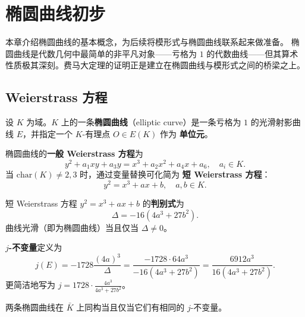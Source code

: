 \chapter{椭圆曲线初步}
\label{ch:elliptic-curves-intro}

本章介绍椭圆曲线的基本概念，为后续将模形式与椭圆曲线联系起来做准备。
椭圆曲线是代数几何中最简单的非平凡对象——亏格为 $1$ 的代数曲线——但其算术
性质极其深刻。费马大定理的证明正是建立在椭圆曲线与模形式之间的桥梁之上。

\section{Weierstrass 方程}
\label{sec:weierstrass-equation}

\begin{definition}[椭圆曲线]
\label{def:elliptic-curve}
设 $K$ 为域。$K$ 上的一条\textbf{椭圆曲线}（elliptic curve）是一条亏格为
$1$ 的光滑射影曲线 $E$，并指定一个 $K$-有理点 $O \in E(K)$ 作为
\textbf{单位元}。
\end{definition}

\begin{definition}[Weierstrass 方程]
\label{def:weierstrass-equation}
椭圆曲线的\textbf{一般 Weierstrass 方程}为
\[
  y^2 + a_1 xy + a_3 y = x^3 + a_2 x^2 + a_4 x + a_6,
  \quad a_i \in K.
\]
当 $\mathrm{char}(K) \neq 2, 3$ 时，通过变量替换可化简为
\textbf{短 Weierstrass 方程}：
\[
  y^2 = x^3 + ax + b, \quad a, b \in K.
\]
\end{definition}

\begin{definition}
\label{def:discriminant-j}
短 Weierstrass 方程 $y^2 = x^3 + ax + b$ 的\textbf{判别式}为
\[
  \Delta = -16(4a^3 + 27b^2).
\]
曲线光滑（即为椭圆曲线）当且仅当 $\Delta \neq 0$。

\textbf{$j$-不变量}定义为
\[
  j(E) = -1728 \frac{(4a)^3}{\Delta} = \frac{-1728 \cdot 64 a^3}{-16(4a^3 + 27b^2)}
  = \frac{6912 a^3}{16(4a^3 + 27b^2)}.
\]
更简洁地写为 $j = 1728 \cdot \frac{4a^3}{4a^3 + 27b^2}$。

两条椭圆曲线在 $\bar{K}$ 上同构当且仅当它们有相同的 $j$-不变量。
\end{definition}

